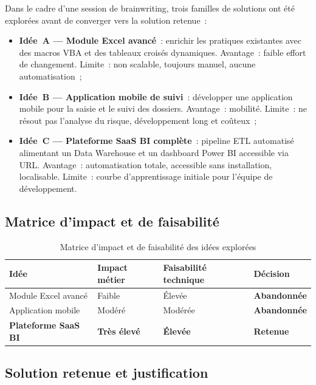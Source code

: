\documentclass[12pt, a4paper]{report}
\begin{document}
Dans le cadre d'une session de brainwriting, trois familles de solutions ont été
explorées avant de converger vers la solution retenue~:

\begin{itemize}[leftmargin=1.5em]
  \item \textbf{Idée~A --- Module Excel avancé}~: enrichir les pratiques existantes
    avec des macros VBA et des tableaux croisés dynamiques. Avantage~: faible
    effort de changement. Limite~: non scalable, toujours manuel, aucune
    automatisation~;
  \item \textbf{Idée~B --- Application mobile de suivi}~: développer une application
    mobile pour la saisie et le suivi des dossiers. Avantage~: mobilité. Limite~:
    ne résout pas l'analyse du risque, développement long et coûteux~;
  \item \textbf{Idée~C --- Plateforme SaaS BI complète}~: pipeline ETL automatisé
    alimentant un Data Warehouse et un dashboard Power BI accessible via URL.
    Avantage~: automatisation totale, accessible sans installation, localisable.
    Limite~: courbe d'apprentissage initiale pour l'équipe de développement.
\end{itemize}

\subsection{Matrice d'impact et de faisabilité}

\begin{table}[H]
\centering
\caption{Matrice d'impact et de faisabilité des idées explorées}
\label{tab:matrice_idees}
\renewcommand{\arraystretch}{1.4}
\begin{tabularx}{\textwidth}{p{4.5cm} p{2.5cm} p{2.5cm} X}
\toprule
\rowcolor{primary!12}
Idée & Impact métier & Faisabilité technique & Décision \\
\midrule
Module Excel avancé & Faible & Élevée & \textcolor{dangercolor}{\textbf{Abandonnée}} \\
Application mobile  & Modéré & Modérée & \textcolor{dangercolor}{\textbf{Abandonnée}} \\
\textbf{Plateforme SaaS BI} & \textbf{Très élevé} & \textbf{Élevée} & \textcolor{successcolor}{\textbf{Retenue}} \\
\bottomrule
\end{tabularx}
\end{table}

\subsection{Solution retenue et justification}
\end{document}
